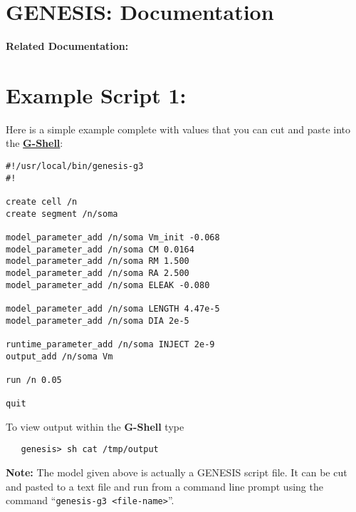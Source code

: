 \documentclass[12pt]{article}
\begin{document}
\section*{GENESIS: Documentation}

{\bf Related Documentation:}

\section*{Example Script 1:}

Here is a simple example complete with values that you can cut and paste into the \href{../gshell/gshell.tex}{\bf G-Shell}:

\begin{verbatim}
#!/usr/local/bin/genesis-g3
#!

create cell /n
create segment /n/soma

model_parameter_add /n/soma Vm_init -0.068
model_parameter_add /n/soma CM 0.0164
model_parameter_add /n/soma RM 1.500
model_parameter_add /n/soma RA 2.500
model_parameter_add /n/soma ELEAK -0.080

model_parameter_add /n/soma LENGTH 4.47e-5
model_parameter_add /n/soma DIA 2e-5

runtime_parameter_add /n/soma INJECT 2e-9
output_add /n/soma Vm

run /n 0.05

quit
\end{verbatim}
To view output within the {\bf G-Shell} type
\begin{verbatim}
   genesis> sh cat /tmp/output
\end{verbatim}
{\bf Note:} The model given above is actually a GENESIS script file. It can be cut and pasted to a text file and run from a command line prompt using the command ``{\tt genesis-g3 <file-name>}''.
\end{document}
